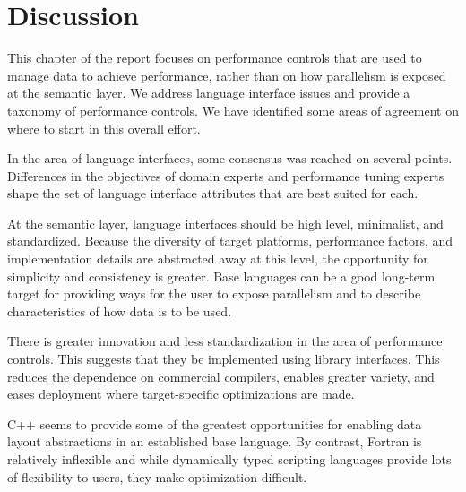 

\section{Discussion}

This chapter of the report focuses on performance controls that are
used to manage data to achieve performance, rather than on how
parallelism is exposed at the semantic layer.  We address language
interface issues and provide a taxonomy of performance controls.
 We have
identified some areas of agreement on where to start in this overall
effort.

In the area of language interfaces, some consensus was reached on
several points.  Differences in the objectives of domain experts and
performance tuning experts shape the set of language interface
attributes that are best suited for each.

At the semantic layer, language interfaces should be high level,
minimalist, and standardized.  Because the diversity of target
platforms, performance factors, and implementation details are
abstracted away at this level, the opportunity for simplicity and
consistency is greater.  Base languages can be a good long-term target
for providing ways for the user to expose parallelism and to describe
characteristics of how data is to be used.

There is greater innovation and less standardization in the area of
performance controls.  This suggests that they be implemented using
library interfaces.  This reduces the dependence on commercial
compilers, enables greater variety, and eases deployment where
target-specific optimizations are made.

C++ seems to provide some of the greatest opportunities for enabling
data layout abstractions in an established base language. By contrast,
Fortran is relatively inflexible and while dynamically typed scripting
languages provide lots of flexibility to users, they make optimization
difficult.

